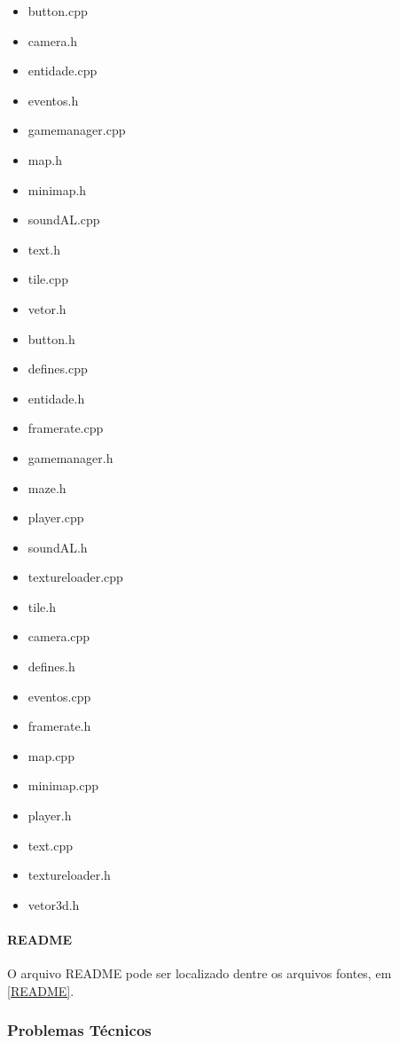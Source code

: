 \begin{itemize}
	\item button.cpp
	\item camera.h
	\item entidade.cpp
	\item eventos.h 
	\item gamemanager.cpp  
	\item map.h        
	\item minimap.h   
	\item soundAL.cpp  
	\item text.h             
	\item tile.cpp   
	\item vetor.h
	\item button.h    
	\item defines.cpp  
	\item entidade.h    
	\item framerate.cpp  
	\item gamemanager.h    
	\item maze.h       
	\item player.cpp  
	\item soundAL.h    
	\item textureloader.cpp  
	\item tile.h
	\item camera.cpp  
	\item defines.h    
	\item eventos.cpp   
	\item framerate.h    
	\item map.cpp          
	\item minimap.cpp  
	\item player.h    
	\item text.cpp     
	\item textureloader.h    
	\item vetor3d.h
\end{itemize}

\paragraph{\textbf{README}}

O arquivo README pode ser localizado dentre os arquivos fontes, em \ref{README}.

\subsubsection{Problemas Técnicos}\label{problens}

